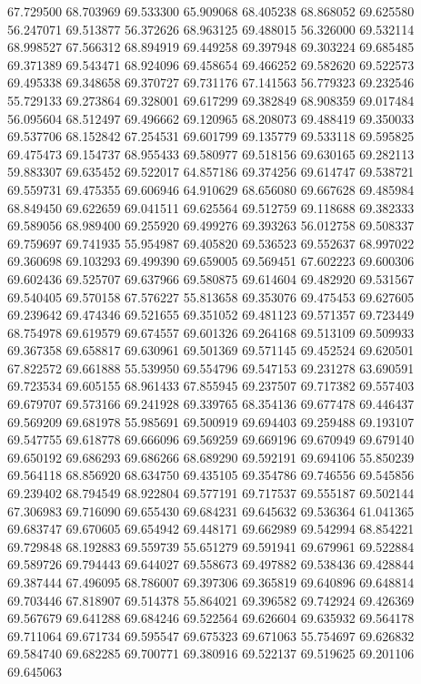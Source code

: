 67.729500
68.703969
69.533300
65.909068
68.405238
68.868052
69.625580
56.247071
69.513877
56.372626
68.963125
69.488015
56.326000
69.532114
68.998527
67.566312
68.894919
69.449258
69.397948
69.303224
69.685485
69.371389
69.543471
68.924096
69.458654
69.466252
69.582620
69.522573
69.495338
69.348658
69.370727
69.731176
67.141563
56.779323
69.232546
55.729133
69.273864
69.328001
69.617299
69.382849
68.908359
69.017484
56.095604
68.512497
69.496662
69.120965
68.208073
69.488419
69.350033
69.537706
68.152842
67.254531
69.601799
69.135779
69.533118
69.595825
69.475473
69.154737
68.955433
69.580977
69.518156
69.630165
69.282113
59.883307
69.635452
69.522017
64.857186
69.374256
69.614747
69.538721
69.559731
69.475355
69.606946
64.910629
68.656080
69.667628
69.485984
68.849450
69.622659
69.041511
69.625564
69.512759
69.118688
69.382333
69.589056
68.989400
69.255920
69.499276
69.393263
56.012758
69.508337
69.759697
69.741935
55.954987
69.405820
69.536523
69.552637
68.997022
69.360698
69.103293
69.499390
69.659005
69.569451
67.602223
69.600306
69.602436
69.525707
69.637966
69.580875
69.614604
69.482920
69.531567
69.540405
69.570158
67.576227
55.813658
69.353076
69.475453
69.627605
69.239642
69.474346
69.521655
69.351052
69.481123
69.571357
69.723449
68.754978
69.619579
69.674557
69.601326
69.264168
69.513109
69.509933
69.367358
69.658817
69.630961
69.501369
69.571145
69.452524
69.620501
67.822572
69.661888
55.539950
69.554796
69.547153
69.231278
63.690591
69.723534
69.605155
68.961433
67.855945
69.237507
69.717382
69.557403
69.679707
69.573166
69.241928
69.339765
68.354136
69.677478
69.446437
69.569209
69.681978
55.985691
69.500919
69.694403
69.259488
69.193107
69.547755
69.618778
69.666096
69.569259
69.669196
69.670949
69.679140
69.650192
69.686293
69.686266
68.689290
69.592191
69.694106
55.850239
69.564118
68.856920
68.634750
69.435105
69.354786
69.746556
69.545856
69.239402
68.794549
68.922804
69.577191
69.717537
69.555187
69.502144
67.306983
69.716090
69.655430
69.684231
69.645632
69.536364
61.041365
69.683747
69.670605
69.654942
69.448171
69.662989
69.542994
68.854221
69.729848
68.192883
69.559739
55.651279
69.591941
69.679961
69.522884
69.589726
69.794443
69.644027
69.558673
69.497882
69.538436
69.428844
69.387444
67.496095
68.786007
69.397306
69.365819
69.640896
69.648814
69.703446
67.818907
69.514378
55.864021
69.396582
69.742924
69.426369
69.567679
69.641288
69.684246
69.522564
69.626604
69.635932
69.564178
69.711064
69.671734
69.595547
69.675323
69.671063
55.754697
69.626832
69.584740
69.682285
69.700771
69.380916
69.522137
69.519625
69.201106
69.645063
